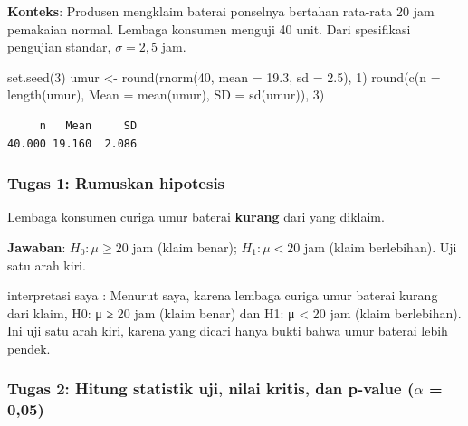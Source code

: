 \documentclass[
  indonesian,
  letterpaper,
]{book}
\newenvironment{Shaded}{\begin{snugshade}}{\end{snugshade}}
\newcommand{\AttributeTok}[1]{\textcolor[rgb]{0.40,0.45,0.13}{#1}}
\newcommand{\DecValTok}[1]{\textcolor[rgb]{0.68,0.00,0.00}{#1}}
\newcommand{\FloatTok}[1]{\textcolor[rgb]{0.68,0.00,0.00}{#1}}
\newcommand{\FunctionTok}[1]{\textcolor[rgb]{0.28,0.35,0.67}{#1}}
\newcommand{\NormalTok}[1]{\textcolor[rgb]{0.00,0.23,0.31}{#1}}
\newcommand{\OtherTok}[1]{\textcolor[rgb]{0.00,0.23,0.31}{#1}}
\begin{document}
\textbf{Konteks}: Produsen mengklaim baterai ponselnya bertahan
rata-rata 20 jam pemakaian normal. Lembaga konsumen menguji 40 unit.
Dari spesifikasi pengujian standar, \(\sigma = 2{,}5\) jam.

\begin{Shaded}
\begin{Highlighting}[]
\FunctionTok{set.seed}\NormalTok{(}\DecValTok{3}\NormalTok{)}
\NormalTok{umur }\OtherTok{\textless{}{-}} \FunctionTok{round}\NormalTok{(}\FunctionTok{rnorm}\NormalTok{(}\DecValTok{40}\NormalTok{, }\AttributeTok{mean =} \FloatTok{19.3}\NormalTok{, }\AttributeTok{sd =} \FloatTok{2.5}\NormalTok{), }\DecValTok{1}\NormalTok{)}
\FunctionTok{round}\NormalTok{(}\FunctionTok{c}\NormalTok{(}\AttributeTok{n =} \FunctionTok{length}\NormalTok{(umur), }\AttributeTok{Mean =} \FunctionTok{mean}\NormalTok{(umur), }\AttributeTok{SD =} \FunctionTok{sd}\NormalTok{(umur)), }\DecValTok{3}\NormalTok{)}
\end{Highlighting}
\end{Shaded}

\begin{verbatim}
     n   Mean     SD 
40.000 19.160  2.086 
\end{verbatim}

\subsubsection{Tugas 1: Rumuskan
hipotesis}\label{tugas-1-rumuskan-hipotesis}

Lembaga konsumen curiga umur baterai \textbf{kurang} dari yang diklaim.

\textbf{Jawaban}: \(H_0: \mu \ge 20\) jam (klaim benar);
\(H_1: \mu < 20\) jam (klaim berlebihan). Uji satu arah kiri.

interpretasi saya : Menurut saya, karena lembaga curiga umur baterai
kurang dari klaim, H0: μ ≥ 20 jam (klaim benar) dan H1: μ \textless{} 20
jam (klaim berlebihan). Ini uji satu arah kiri, karena yang dicari hanya
bukti bahwa umur baterai lebih pendek.

\subsubsection{\texorpdfstring{Tugas 2: Hitung statistik uji, nilai
kritis, dan p-value (\(\alpha\) =
0,05)}{Tugas 2: Hitung statistik uji, nilai kritis, dan p-value (\textbackslash alpha = 0,05)}}\label{tugas-2-hitung-statistik-uji-nilai-kritis-dan-p-value-alpha-005}
\end{document}

